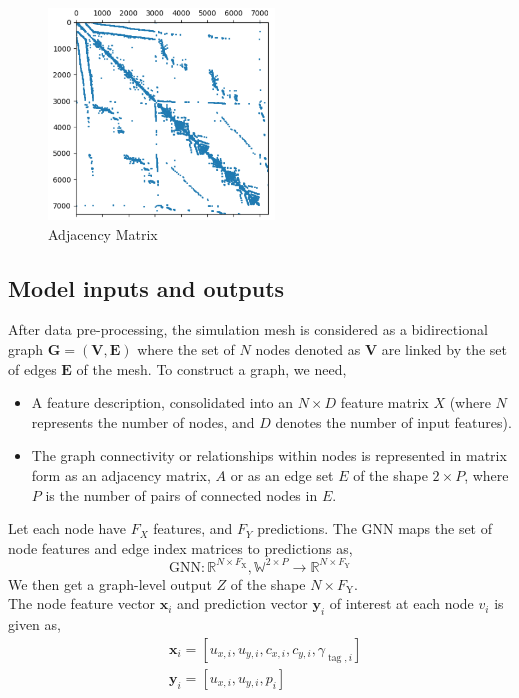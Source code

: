 \begin{figure}[ht]
    \centering
    \includegraphics[width=6cm]{images/Methodology/AdjMatrix.png}
    \caption{Adjacency Matrix}
    \label{adjmat}
\end{figure}
\subsection{Model inputs and outputs}
After data pre-processing, the simulation mesh is considered as a bidirectional graph $\mathbf{G} = (\mathbf{V}, \mathbf{E})$ where the set of $N$ nodes denoted as $\mathbf{V}$ are linked by the set of edges $\mathbf{E}$ of the mesh. To construct a graph, we need,
\begin{itemize}
\item A feature description, consolidated into an $N \times D$ feature matrix $X$ (where $N$ represents the number of nodes, and $D$ denotes the number of input features).
\item The graph connectivity or relationships within nodes is represented in matrix form as an adjacency matrix, $A$ or as an edge set $E$ of the shape $2 \times P$, where $P$ is the number of pairs of connected nodes in $E$.
\end{itemize}
Let each node have $F_X$ features, and $F_Y$ predictions. The GNN maps the set of node features and edge index matrices to predictions as, 
\begin{equation}
    \mathrm{GNN}: \mathbb{R}^{{N} \times F_{\mathrm{X}}}, \mathbb{W}^{2 \times P} \rightarrow \mathbb{R}^{{N} \times F_{\mathrm{Y}}}
    \end{equation}
We then get a graph-level output $Z$ of the shape ${N} \times F_{\mathrm{Y}}$. \\
The node feature vector $\mathbf{x}_i$ and prediction vector $\mathbf{y}_i$ of interest at each node $v_i$ is given as,
\begin{equation}
    \begin{aligned}
    & \mathbf{x}_i=\left[u_{x, i}, u_{y, i},c_{x, i}, c_{y, i}, \gamma_{\operatorname{tag}, i}\right] \\
    & \mathbf{y}_i=\left[u_{x, i}, u_{y, i}, p_i\right]
    \end{aligned}
\end{equation}
